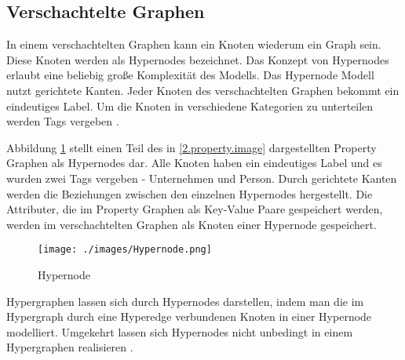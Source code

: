 \subsection{Verschachtelte Graphen}
In einem verschachtelten Graphen kann ein Knoten wiederum ein Graph sein. Diese Knoten werden als Hypernodes bezeichnet.
Das Konzept von Hypernodes erlaubt eine beliebig große Komplexität des Modells.
Das Hypernode Modell nutzt gerichtete Kanten.
Jeder Knoten des verschachtelten Graphen bekommt ein eindeutiges Label.
Um die Knoten in verschiedene Kategorien zu unterteilen werden Tags vergeben \cite{poulovassilis1994nested}.

Abbildung \ref{2.hypernode.image} stellt einen Teil des in \ref{2.property.image} dargestellten Property Graphen als Hypernodes dar.
Alle Knoten haben ein eindeutiges Label und es wurden zwei Tags vergeben - Unternehmen und Person.
Durch gerichtete Kanten werden die Beziehungen zwischen den einzelnen Hypernodes hergestellt.
Die Attributer, die im Property Graphen als Key-Value Paare gespeichert werden, werden im verschachtelten Graphen als Knoten einer Hypernode gespeichert.
\begin{figure}[H]
	\begin{center}
		\texttt{[image: ./images/Hypernode.png]}
		\label{2.hypernode.image}
		\caption{Hypernode}
	\end{center}
\end{figure}

Hypergraphen lassen sich durch Hypernodes darstellen, indem man die im Hypergraph durch eine Hyperedge verbundenen Knoten in einer Hypernode modelliert.
Umgekehrt lassen sich Hypernodes nicht unbedingt in einem Hypergraphen realisieren \cite{poulovassilis1994nested}.